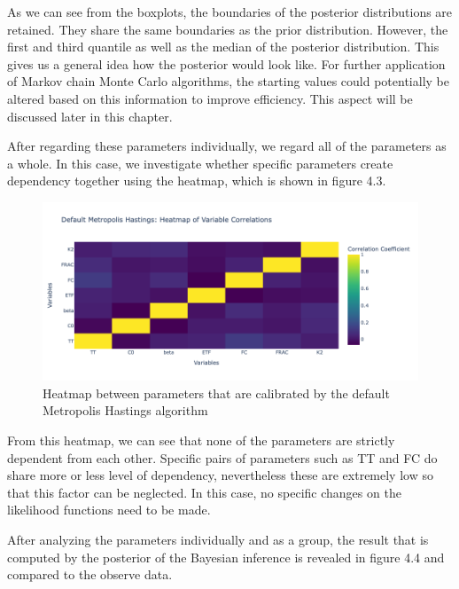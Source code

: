 As we can see from the boxplots, the boundaries of the posterior distributions are retained. They share the same boundaries as the prior distribution. However, the first and third quantile as well as the median of the posterior distribution. This gives us a general idea how the posterior would look like. For further application of Markov chain Monte Carlo algorithms, the starting values could potentially be altered based on this information to improve efficiency. This aspect will be discussed later in this chapter.

After regarding these parameters individually, we regard all of the parameters as a whole. In this case, we investigate whether specific parameters create dependency together using the heatmap, which is shown in figure 4.3.

\begin{figure}
    \centering
    \includegraphics[width=1\textwidth]{figures/basic_mh/default_mh/default_mh_heatmap.png}
    \captionsetup{width=.8\textwidth}
    \caption{Heatmap between parameters that are calibrated by the default Metropolis Hastings algorithm}
    \label{fig:enter-label}
\end{figure}

From this heatmap, we can see that none of the parameters are strictly dependent from each other. Specific pairs of parameters such as TT and FC do share more or less level of dependency, nevertheless these are extremely low so that this factor can be neglected. In this case, no specific changes on the likelihood functions need to be made.

After analyzing the parameters individually and as a group, the result that is computed by the posterior of the Bayesian inference is revealed in figure 4.4 and compared to the observe data. 

